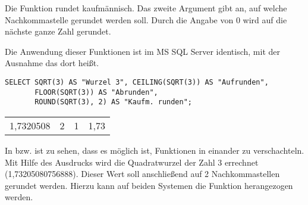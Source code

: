         \begin{merke}
          Die Funktion  rundet kaufmännisch. Das zweite
          Argument gibt an, auf welche Nachkommastelle gerundet werden soll.
          Durch die Angabe von 0 wird auf die nächste ganze Zahl gerundet.
        \end{merke}
        Die Anwendung dieser Funktionen ist im MS SQL Server identisch, mit der
        Ausnahme das  dort 
        heißt.
        \begin{lstlisting}[language=ms_sql,caption={Rundungsfunktionen in MS SQL},label=sql03_16]
SELECT SQRT(3) AS "Wurzel 3", CEILING(SQRT(3)) AS "Aufrunden",
       FLOOR(SQRT(3)) AS "Abrunden",
       ROUND(SQRT(3), 2) AS "Kaufm. runden";
        \end{lstlisting}
        \begin{center}
          \begin{small}
            \tablehead{}

            \begin{mssql}
              \begin{supertabular}{llll}
                1,7320508 & 2 & 1 & 1,73 \\
              \end{supertabular}
            \end{mssql}
          \end{small}
        \end{center}
        In  bzw.  ist zu sehen, dass es
        möglich ist, Funktionen in einander zu verschachteln. Mit Hilfe des
        Ausdrucks  wird die Quadratwurzel der Zahl 3
        errechnet (1,73205080756888). Dieser Wert soll anschließend auf 2
        Nachkommastellen gerundet werden. Hierzu kann auf beiden Systemen die
        Funktion  herangezogen werden. 
        

